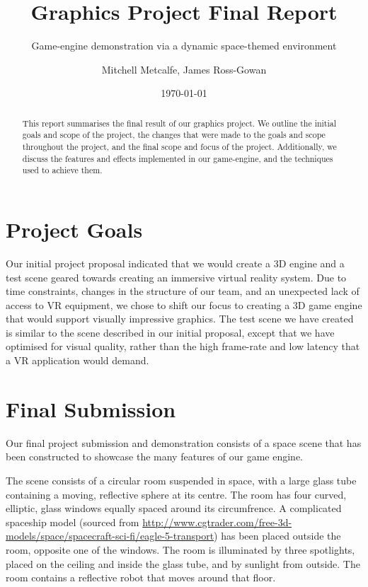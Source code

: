 \documentclass[11pt]{scrartcl} %
\title{Graphics Project Final Report}
\subtitle{Game-engine demonstration via a dynamic space-themed environment}
\author{ Mitchell Metcalfe, James Ross-Gowan }
\date{\today} %
\begin{document}
\maketitle

\begin{abstract}

    This report summarises the final result of our graphics project. We outline
    the initial goals and scope of the project, the changes that were made to
    the goals and scope throughout the project, and the final scope and focus
    of the project. Additionally, we discuss the features and effects
    implemented in our game-engine, and the  techniques used to achieve them.

\end{abstract}


\section{Project Goals}

    Our initial project proposal indicated that we would create a 3D engine and a test scene geared towards creating an immersive virtual reality system.
    Due to time constraints, changes in the structure of our team, and an unexpected lack of access to VR equipment, we chose to shift our focus to creating a 3D game engine that would support visually impressive graphics. The test scene we have created is similar to the scene described in our initial proposal, except that we have optimised for visual quality, rather than the high frame-rate and low latency that a VR application would demand.


\section{Final Submission}

    Our final project submission and demonstration consists of a space scene
    that has been constructed to showcase the many features of our game engine.

    The scene consists of a circular room suspended in space, with a large glass tube containing a moving, reflective sphere at its centre. The room has four curved, elliptic, glass windows equally spaced around its circumfrence.
    A complicated spaceship model
    (sourced from \url{http://www.cgtrader.com/free-3d-models/space/spacecraft-sci-fi/eagle-5-transport})
    has been placed outside the room, opposite one of the windows.
    The room is illuminated by three spotlights, placed on the ceiling and inside the glass tube, and by sunlight from outside.
    The room contains a reflective robot that moves around that floor.
\end{document}
